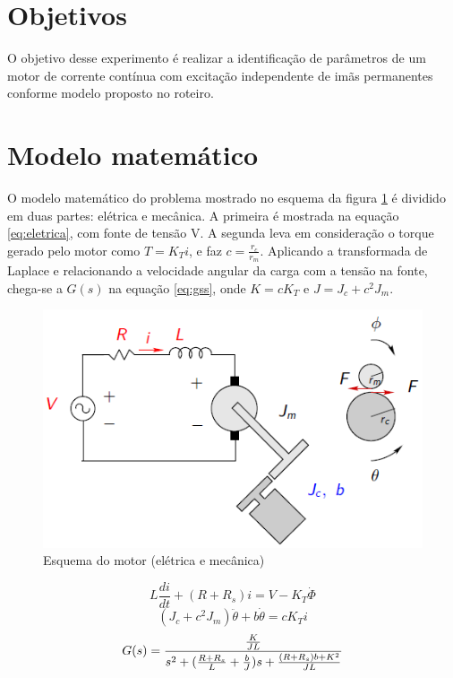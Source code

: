 \documentclass{article}
\begin{document}


\onehalfspacing
\section{Objetivos} 
O objetivo desse experimento é realizar a identificação de parâmetros de um motor de corrente contínua com excitação independente de imãs permanentes conforme modelo proposto no roteiro\cite{bb:roteiro}. 
	
\section{Modelo matemático}
O modelo matemático do problema mostrado no esquema da figura \ref{fig:esqmotor} é dividido em duas partes: elétrica e mecânica. A primeira é mostrada na equação \ref{eq:eletrica}, com fonte de tensão V. A segunda leva em consideração o torque gerado pelo motor como $T=K_Ti$, e faz $c=\frac{r_c}{r_m}$. Aplicando a transformada de Laplace e relacionando a velocidade angular da carga com a tensão na fonte, chega-se a $G(s)$ na equação \ref{eq:gss}, onde $K=cK_T$ e $J=J_c+c^2J_m$.

\begin{figure}[H]
	\centering
	\includegraphics[width=0.8\linewidth]{esqmotor}
	\caption{Esquema do motor (elétrica e mecânica)}
	\label{fig:esqmotor}
\end{figure}

\begin{equation}
\label{eq:eletrica}
L\frac{di}{dt}+(R+R_s)i=V-K_T\dot{\Phi}
\end{equation}
\begin{equation}
\label{eq:mecanica}
(J_c+c^2J_m)\ddot{\theta}+b\dot{\theta}=cK_Ti
\end{equation}
\begin{equation}
\label{eq:gss}
G(s)=\frac{\frac{K}{JL}}{s^2+(\frac{R+R_s}{L}+\frac{b}{J})s+\frac{(R+R_s)b+K^2}{JL}}\\
\end{equation}
\end{document}
